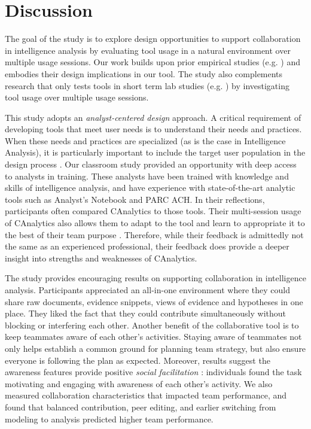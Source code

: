 \section{Discussion}\label{discussion}

The goal of the study is to explore design opportunities to support
collaboration in intelligence analysis by evaluating tool usage in a natural
environment over multiple usage sessions. Our work builds upon prior
empirical studies (e.g.
\cite{Carroll2013,Borge2012,Kang2011,Chin2009}) and embodies
their design implications in our tool. The study also complements
research that only tests tools in short term lab studies (e.g.
\cite{Convertino2011,Goyal2016,Hajizadeh2013}) by investigating tool usage over multiple usage sessions.

This study adopts an \emph{analyst-centered design} approach. A critical requirement of developing tools that meet user needs is to
understand their needs and practices. When these needs and practices
are specialized (as is the case in Intelligence Analysis), it is
particularly important to include the target user population in
the design process \cite{Scholtz2014}.
Our classroom study provided an opportunity with deep
access to analysts in training. These analysts have been trained
with knowledge and skills of intelligence analysis, and have experience with state-of-the-art analytic
tools such as Analyst's Notebook and PARC ACH. In their reflections, participants often compared CAnalytics to
those tools. Their multi-session usage of CAnalytics also allows them to adapt to the tool and learn to appropriate it to the best of their team purpose \cite{Stahl2006}. Therefore, while their feedback is
admittedly not the same as an experienced professional,
their feedback does provide a deeper insight into strengths and
weaknesses of CAnalytics.

The study provides encouraging results on supporting collaboration in intelligence analysis.
Participants appreciated an all-in-one environment where they could
share raw documents, evidence snippets, views of evidence and hypotheses
in one place. They liked the fact that they could contribute
simultaneously without blocking or interfering each other. Another
benefit of the collaborative tool is to keep teammates aware of each
other's activities. Staying aware of teammates not only helps establish a common ground for planning team strategy, but also ensure everyone is following the plan as expected. Moreover, results suggest the awareness features provide positive \emph{social facilitation} \cite{Zajonc1965}: individuals found the task motivating and engaging with awareness of each other's activity. We also measured collaboration characteristics that impacted team performance, and found that balanced contribution, peer editing, and earlier switching  from modeling to analysis predicted higher team performance.

